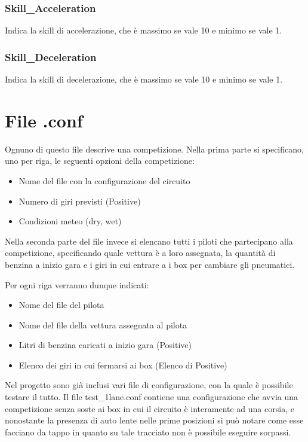 \documentclass[a4paper,11pt, twoside]{book}
\begin{document}
	\subsubsection{Skill\_Acceleration}
	  Indica la skill di accelerazione, che è massimo se vale 10 e minimo se vale 1.

	\subsubsection{Skill\_Deceleration}
	  Indica la skill di decelerazione, che è massimo se vale 10 e minimo se vale 1.
	  
      \section{File .conf}
	Ognuno di questo file descrive una competizione. Nella prima parte si specificano, uno per riga,
	le seguenti opzioni della competizione:
	
	\begin{itemize}
	  \item Nome del file con la configurazione del circuito
	  \item Numero di giri previsti (Positive)
	  \item Condizioni meteo (dry, wet)
	\end{itemize}
	
	Nella seconda parte del file invece si elencano tutti i piloti che partecipano alla competizione, 
	specificando quale vettura è a loro assegnata, la quantità di benzina a inizio gara e i giri in cui 
	entrare a i box per cambiare gli pneumatici.
	
	Per ogni riga verranno dunque indicati:
	\begin{itemize}
	  \item Nome del file del pilota
	  \item Nome del file della vettura assegnata al pilota
	  \item Litri di benzina caricati a inizio gara (Positive)
	  \item Elenco dei giri in cui fermarsi ai box (Elenco di Positive)
	\end{itemize}

        Nel progetto sono già inclusi vari file di configurazione, con la quale è possibile testare il tutto.
        Il file test\_1lane.conf contiene una configurazione che avvia una competizione senza soste ai box
	in cui il circuito è interamente ad una corsia,
	e nonostante la presenza di auto lente nelle prime posizioni si può notare come esse facciano da tappo
	in quanto su tale tracciato non è possibile eseguire sorpassi.
	
\end{document}
